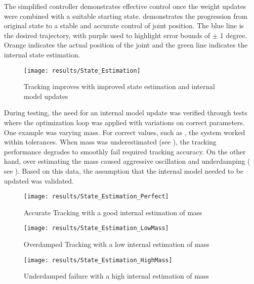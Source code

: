 
The simplified controller demonstrates effective control once the weight updates
were combined with a suitable starting state. 
demonstrates the progression from original state to a stable and accurate
control of joint position. The blue line is the desired trajectory, with purple
used to highlight error bounds of $\pm$ 1 degree. Orange indicates the actual
position of the joint and the green line indicates the internal state
estimation.

\begin{figure}
\centering
\texttt{[image: results/State\_Estimation]}
\caption{Tracking improves with improved state estimation and internal model
updates}
\label{fig:SimplifiedTracking}
\end{figure}


During testing, the need for an internal model update was verified through 
tests where the optimization loop was applied with variations on correct 
parameters. One example was varying mass. For correct values, such as 
, the system worked within tolerances. When 
mass was underestimated (see ), the tracking 
performance degrades to smoothly fail required tracking accuracy. On the other 
hand, over estimating the mass caused aggressive oscillation and underdamping (
see ). Based on this data, the assumption 
that the internal model needed to be updated was validated.

\begin{figure}
\centering
\texttt{[image: results/State\_Estimation\_Perfect]}
\caption{Accurate Tracking with a good internal estimation of mass}
\label{fig:StateEstimationPerfect}
\end{figure}

\begin{figure}
\centering
\texttt{[image: results/State\_Estimation\_LowMass]}
\caption{Overdamped Tracking with a low internal estimation of mass}
\label{fig:StateEstimationLowMass}
\end{figure}

\begin{figure}
\centering
\texttt{[image: results/State\_Estimation\_HighMass]}
\caption{Underdamped failure with a high internal estimation of mass}
\label{fig:StateEstimationHighMass}
\end{figure}

